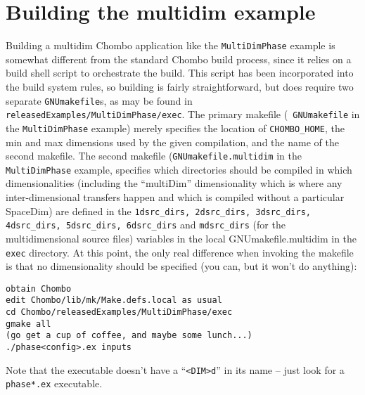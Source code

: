 \section{Building the multidim example}
Building a multidim Chombo application like the {\tt MultiDimPhase}
example is somewhat different from the standard
Chombo build process, since it relies on a build shell script to 
orchestrate the build. This script has been incorporated into the
build system rules, so building is fairly straightforward, but does
require two separate {\tt GNUmakefile}s, as may be found in {\tt
  releasedExamples/MultiDimPhase/exec}.  The primary makefile ({\tt
  GNUmakefile} in the {\tt MultiDimPhase} example) merely specifies
the location of {\tt CHOMBO\_HOME}, the min and max dimensions used by
the given compilation, and the name of the second makefile. The second
makefile ({\tt GNUmakefile.multidim} in the {\tt MultiDimPhase}
example, specifies which directories should be compiled in which 
dimensionalities (including the ``multiDim'' dimensionality which is
where any inter-dimensional transfers happen and which is compiled without
a particular SpaceDim) are defined in the {\tt 1dsrc\_dirs, 2dsrc\_dirs,
  3dsrc\_dirs, 4dsrc\_dirs, 5dsrc\_dirs, 6dsrc\_dirs} and {\tt mdsrc\_dirs}
(for the multidimensional source files) variables in the local
GNUmakefile.multidim in the {\tt exec} directory.
At this point,
the only real difference when invoking the makefile is that no
dimensionality should be specified (you can, but it won't do
anything):
\begin{verbatim}
obtain Chombo
edit Chombo/lib/mk/Make.defs.local as usual
cd Chombo/releasedExamples/MultiDimPhase/exec
gmake all
(go get a cup of coffee, and maybe some lunch...)
./phase<config>.ex inputs
\end{verbatim}
Note that the executable doesn't have a ``{\tt <DIM>d}'' in its name -- just
look for a {\tt phase*.ex} executable.
